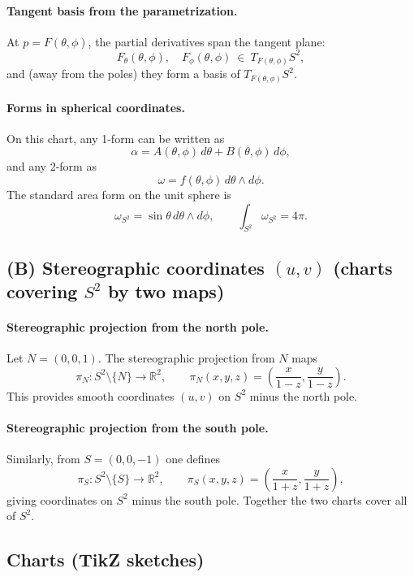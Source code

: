 \documentclass[12pt,a4paper]{article}
\theoremstyle{plain}
\theoremstyle{definition}      %
\begin{document}
	\paragraph{Tangent basis from the parametrization.}
	At $p=F(\theta,\phi)$, the partial derivatives span the tangent plane:
	\[
	F_\theta(\theta,\phi),\quad F_\phi(\theta,\phi)\ \in\ T_{F(\theta,\phi)}S^2,
	\]
	and (away from the poles) they form a basis of $T_{F(\theta,\phi)}S^2$.
	
	\paragraph{Forms in spherical coordinates.}
	On this chart, any 1-form can be written as
	\[
	\alpha = A(\theta,\phi)\,d\theta + B(\theta,\phi)\,d\phi,
	\]
	and any 2-form as
	\[
	\omega = f(\theta,\phi)\,d\theta\wedge d\phi.
	\]
	The standard area form on the unit sphere is
	\[
	\omega_{S^2}=\sin\theta\,d\theta\wedge d\phi,
	\qquad
	\int_{S^2}\omega_{S^2}=4\pi.
	\]
	
	\subsection*{(B) Stereographic coordinates $(u,v)$ (charts covering $S^2$ by two maps)}
	
	\paragraph{Stereographic projection from the north pole.}
	Let $N=(0,0,1)$. The stereographic projection from $N$ maps
	\[
	\pi_N:S^2\setminus\{N\}\to\mathbb{R}^2,\qquad
	\pi_N(x,y,z)=\left(\frac{x}{1-z},\frac{y}{1-z}\right).
	\]
	This provides smooth coordinates $(u,v)$ on $S^2$ minus the north pole.
	
	\paragraph{Stereographic projection from the south pole.}
	Similarly, from $S=(0,0,-1)$ one defines
	\[
	\pi_S:S^2\setminus\{S\}\to\mathbb{R}^2,\qquad
	\pi_S(x,y,z)=\left(\frac{x}{1+z},\frac{y}{1+z}\right),
	\]
	giving coordinates on $S^2$ minus the south pole. Together the two charts cover all of $S^2$.
	
	\subsection*{Charts (TikZ sketches)}
	
\end{document}

